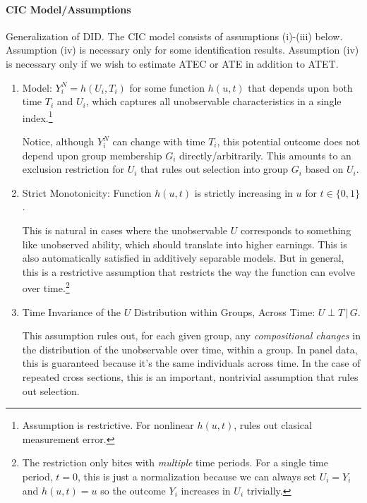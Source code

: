 \documentclass[12pt]{article}
\theoremstyle{plain}
\theoremstyle{definition}
\theoremstyle{remark}
\begin{document}
\paragraph{CIC Model/Assumptions}
Generalization of DID.
The CIC model consists of assumptions (i)-(iii) below.
Assumption (iv) is necessary only for some identification results.
Assumption (iv) is necessary only if we wish to estimate ATEC or
ATE in addition to ATET.
\begin{enumerate}[label=(\roman*)]
  \item
    Model:
    $Y_i^N = h(U_i,T_i)$ for some function $h(u,t)$ that depends
    upon both time $T_i$ and $U_i$, which captures all unobservable
    characteristics in a single index.\footnote{%
      Assumption is restrictive. For nonlinear $h(u,t)$, rules out
      clasical measurement error.
    }

    Notice, although $Y_i^N$ can change with time $T_i$, this
    potential outcome does not depend upon group membership $G_i$
    directly/arbitrarily.
    This amounts to an exclusion restriction for $U_i$ that rules
    out selection into group $G_i$ based on $U_i$.

  \item Strict Monotonicity:
    Function $h(u,t)$ is strictly increasing in $u$ for
    $t\in\{0,1\}$.

    This is natural in cases where the unobservable $U$ corresponds
    to something like unobserved ability, which should translate
    into higher earnings.
    This is also automatically satisfied in additively separable
    models.
    But in general, this is a restrictive assumption that restricts
    the way the function can evolve over time.\footnote{%
      The restriction only bites with \emph{multiple} time periods.
      For a single time period, $t=0$, this is just a normalization
      because we can always set $U_i=Y_i$ and $h(u,t)=u$ so the
      outcome $Y_i$ increases in $U_i$ trivially.
    }

  \item Time Invariance of the $U$ Distribution within Groups,
    Across Time: $U\perp T\,|\,G$.

    This assumption rules out, for each given group, any
    \emph{compositional changes} in the distribution of the
    unobservable over time, within a group.
    In panel data, this is guaranteed because it's the same
    individuals across time.
    In the case of repeated cross sections, this is an important,
    nontrivial assumption that rules out selection.



\end{enumerate}
\end{document}
